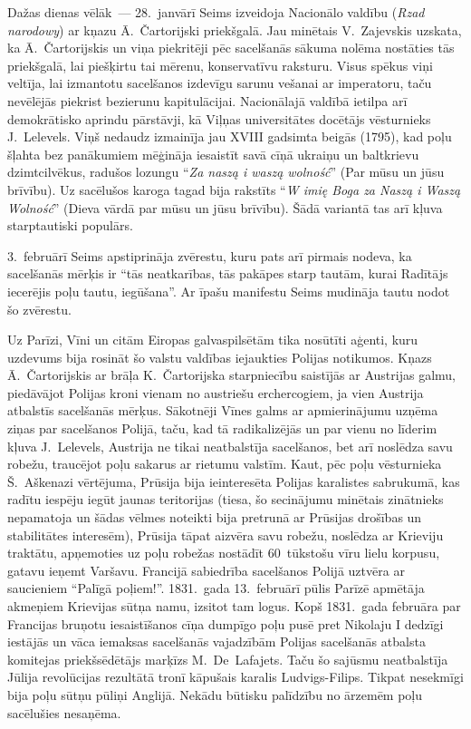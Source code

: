 \documentclass[twoside,a5paper,12pt,fleqn,openany]{extbook}
\newcommand{\pltxti}[1]{\textit{\textpolish{#1}}}
\begin{document}
Dažas dienas vēlāk~--- 28.~janvārī Seims izveidoja Nacionālo valdību (\pltxti{Rzad narodowy}) ar kņazu Ā.~Čartorijski priekšgalā. Jau minētais V.~Zajevskis uzskata, ka Ā.~Čartorijskis un viņa piekritēji pēc sacelšanās sākuma nolēma nostāties tās priekšgalā, lai piešķirtu tai mērenu, konservatīvu raksturu. Visus spēkus viņi veltīja, lai izmantotu sacelšanos izdevīgu sarunu vešanai ar imperatoru, taču nevēlējās piekrist bezierunu kapitulācijai. Nacionālajā valdībā ietilpa arī demokrātisko aprindu pārstāvji, kā Viļņas universitātes docētājs vēsturnieks J.~Lelevels. Viņš nedaudz izmainīja jau XVIII gadsimta beigās (1795), kad poļu šļahta bez panākumiem mēģināja iesaistīt savā cīņā ukraiņu un baltkrievu dzimtcilvēkus, radušos lozungu ``\pltxti{Za naszą i waszą wolność}'' (Par mūsu un jūsu brīvību). Uz sacēlušos karoga tagad bija rakstīts ``\pltxti{W imię Boga za Naszą i Waszą Wolność}'' (Dieva vārdā par mūsu un jūsu brīvību). Šādā variantā tas arī kļuva starptautiski populārs.

3.~februārī Seims apstiprināja zvērestu, kuru pats arī pirmais nodeva, ka sacelšanās mērķis ir ``tās neatkarības, tās pakāpes starp tautām, kurai Radītājs iecerējis poļu tautu, iegūšana''. Ar īpašu manifestu Seims mudināja tautu nodot šo zvērestu.

Uz Parīzi, Vīni un citām Eiropas galvaspilsētām tika nosūtīti aģenti, kuru uzdevums bija rosināt šo valstu valdības iejaukties Polijas notikumos. Kņazs Ā.~Čartorijskis ar brāļa K.~Čartorijska starpniecību saistījās ar Austrijas galmu, piedāvājot Polijas kroni vienam no austriešu erchercogiem, ja vien Austrija atbalstīs sacelšanās mērķus. Sākotnēji Vīnes galms ar apmierinājumu uzņēma ziņas par sacelšanos Polijā, taču, kad tā radikalizējās un par vienu no līderim kļuva J.~Lelevels, Austrija ne tikai neatbalstīja sacelšanos, bet arī noslēdza savu robežu, traucējot poļu sakarus ar rietumu valstīm. Kaut, pēc poļu vēsturnieka Š.~Aškenazi vērtējuma, Prūsija bija ieinteresēta Polijas karalistes sabrukumā, kas radītu iespēju iegūt jaunas teritorijas (tiesa, šo secinājumu minētais zinātnieks nepamatoja un šādas vēlmes noteikti bija pretrunā ar Prūsijas drošības un stabilitātes interesēm), Prūsija tāpat aizvēra savu robežu, noslēdza ar Krieviju traktātu, apņemoties uz poļu robežas nostādīt 60~tūkstošu vīru lielu korpusu, gatavu ieņemt Varšavu. Francijā sabiedrība sacelšanos Polijā uztvēra ar saucieniem ``Palīgā poļiem!''. 1831.~gada 13.~februārī pūlis Parīzē apmētāja akmeņiem Krievijas sūtņa namu, izsitot tam logus. Kopš 1831.~gada februāra par Francijas bruņotu iesaistīšanos cīņa dumpīgo poļu pusē pret Nikolaju I dedzīgi iestājās un vāca iemaksas sacelšanās vajadzībām Polijas sacelšanās atbalsta komitejas priekšsēdētājs marķīzs M.~De~Lafajets. Taču šo sajūsmu neatbalstīja Jūlija revolūcijas rezultātā tronī kāpušais karalis Ludvigs-Filips. Tikpat nesekmīgi bija poļu sūtņu pūliņi Anglijā. Nekādu būtisku palīdzību no ārzemēm poļu sacēlušies nesaņēma.
\end{document}
